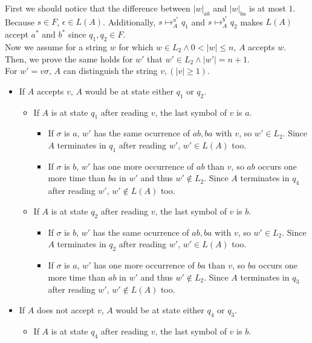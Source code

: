 \documentclass[paper=a4, fontsize=11pt]{scrartcl}
\begin{document}
\begin{enumerate}
\begin{enumerate}
First we should notice that the difference between ${|w|}_{ab}$ and ${|w|}_{ba}$ is at most $1$.
Because $s\in F$, $\epsilon \in L(A)$. Additionally, $s \mapsto_A^{a^*} q_1$ and $s \mapsto_A^{b^*} q_2$ makes $L(A)$ accept $a^*$ and $b^*$ since $q_1, q_2 \in F$.\\
Now we assume for a string $w$ for which $w \in L_2 \land  0 < |w| \le n$, $A$ accepts $w$. Then, we prove the same holds for $w'$ that $w' \in L_2 \land |w'| = n + 1$.\\
For $w'=v\sigma$, $A$ can distinguish the string $v,  (|v| \ge 1)$. \\
\begin{itemize}
	\item If $A$ accepts $v$, $A$ would be at state either $q_1$ or $q_2$.
	\begin{itemize}
		\item If $A$ is at state $q_1$ after reading $v$, the last symbol of $v$ is $a$. 
		\begin{itemize}
			\item If $\sigma$ is $a$, $w'$ has the same ocurrence of $ab, ba$ with $v$, so $w'\in L_2$. Since $A$ terminates in $q_1$ after reading $w'$, $w'\in L(A)$ too.
			\item If $\sigma$ is $b$, $w'$ has one more occurrence of $ab$ than $v$, so $ab$ occurs one more time than $ba$ in $w'$ and thus $w'\notin L_2$. Since $A$ terminates in $q_4$ after reading $w'$, $w' \notin L(A)$ too.
		\end{itemize}
		\item If $A$ is at state $q_2$ after reading $v$, the last symbol of $v$ is $b$. 
		\begin{itemize}
			\item If $\sigma$ is $b$, $w'$ has the same ocurrence of $ab, ba$ with $v$, so $w'\in L_2$. Since $A$ terminates in $q_2$ after reading $w'$, $w'\in L(A)$ too.
			\item If $\sigma$ is $a$, $w'$ has one more occurrence of $ba$ than $v$, so $ba$ occurs one more time than $ab$ in $w'$ and thus $w'\notin L_2$. Since $A$ terminates in $q_3$ after reading $w'$, $w' \notin L(A)$ too.
		\end{itemize}
	\end{itemize}
	\item If $A$ does not accept $v$, $A$ would be at state either $q_4$ or $q_3$.
	\begin{itemize}
		\item If $A$ is at state $q_4$ after reading $v$, the last symbol of $v$ is $b$. 

\end{itemize}
\end{itemize}
\end{enumerate}
\end{enumerate}
\end{document}
